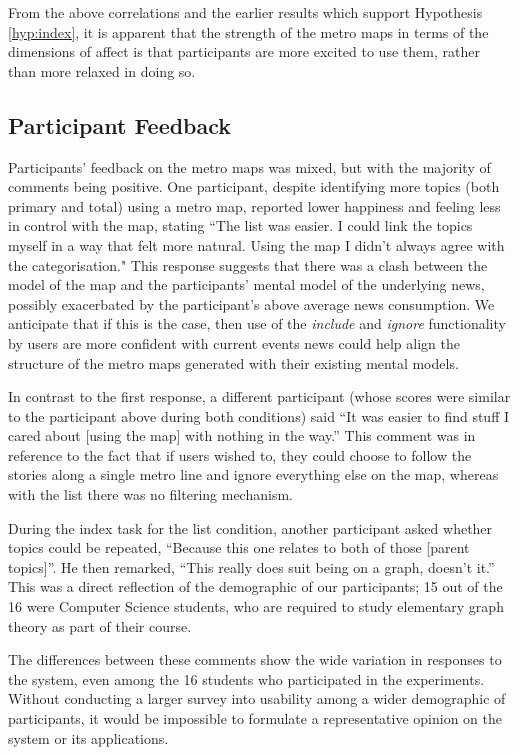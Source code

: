 From the above correlations and the earlier results which support Hypothesis \ref{hyp:index}, it is apparent that the strength of the metro maps in terms of the dimensions of affect is that participants are more excited to use them, rather than more relaxed in doing so.


\subsection{Participant Feedback}

Participants' feedback on the metro maps was mixed, but with the majority of comments being positive. One participant, despite identifying more topics (both primary and total) using a metro map, reported lower happiness and feeling less in control with the map, stating ``The list was easier. I could link the topics myself in a way that felt more natural. Using the map I didn't always agree with the categorisation." This response suggests that there was a clash between the model of the map and the participants' mental model of the underlying news, possibly exacerbated by the participant's above average news consumption.  We anticipate that if this is the case, then use of the \textit{include} and \textit{ignore} functionality by users are more confident with current events news could help align the structure of the metro maps generated with their existing mental models. 

In contrast to the first response, a different participant (whose scores were similar to the participant above during both conditions) said ``It was easier to find stuff I cared about [using the map] with nothing in the way.'' This comment was in reference to the fact that if users wished to, they could choose to follow the stories along a single metro line and ignore everything else on the map, whereas with the list there was no filtering mechanism.

During the index task for the list condition, another participant asked whether topics could be repeated, ``Because this one relates to both of those [parent topics]''. He then remarked, ``This really does suit being on a graph, doesn't it.'' This was a direct reflection of the demographic of our participants; 15 out of the 16 were Computer Science students, who are required to study elementary graph theory as part of their course.

The differences between these comments show the wide variation in responses to the system, even among the 16 students who participated in the experiments. Without conducting a larger survey into usability among a wider demographic of participants, it would be impossible to formulate a representative opinion on the system or its applications.

